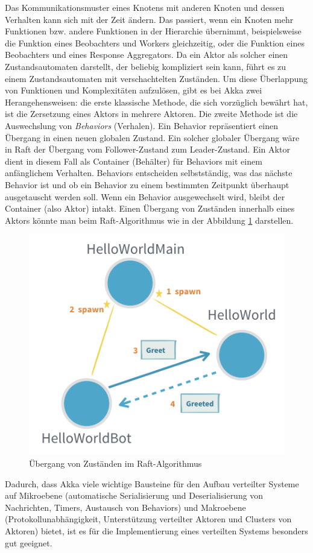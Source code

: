 Das Kommunikationsmuster eines Knotens mit anderen Knoten und dessen Verhalten kann sich mit der Zeit ändern. Das passiert, wenn ein Knoten mehr Funktionen bzw. andere Funktionen in der Hierarchie übernimmt, beispielsweise die Funktion eines Beobachters und Workers gleichzeitig, oder die Funktion eines Beobachters und eines Response Aggregators. Da ein Aktor als solcher einen Zustandsautomaten darstellt, der beliebig kompliziert sein kann, führt es zu einem Zustandsautomaten mit verschachtelten Zuständen. Um diese Überlappung von Funktionen und Komplexitäten aufzulösen, gibt es bei Akka zwei Herangehensweisen: die erste klassische Methode, die sich vorzüglich bewährt hat, ist die Zersetzung eines Aktors in mehrere Aktoren. Die zweite Methode ist die Auswechslung von \textit{Behaviors} (Verhalen). Ein Behavior repräsentiert einen Übergang in einen neuen globalen Zustand. Ein solcher globaler Übergang wäre in Raft der Übergang vom Follower-Zustand zum Leader-Zustand. Ein Aktor dient in diesem Fall als Container (Behälter) für Behaviors mit einem anfänglichem Verhalten. Behaviors entscheiden selbstständig, was das nächste Behavior ist und ob ein Behavior zu einem bestimmten Zeitpunkt überhaupt ausgetauscht werden soll. Wenn ein Behavior ausgewechselt wird, bleibt der Container (also Aktor) intakt. Einen Übergang von Zuständen innerhalb eines Aktors könnte man beim Raft-Algorithmus wie in der Abbildung \ref{fig:stateTransition} darstellen.

\begin{figure}
	\centering
	\includegraphics[width=0.7\linewidth]{images/4_state_transition}
	\caption{Übergang von Zuständen im Raft-Algorithmus}
	\label{fig:stateTransition}
\end{figure}

Dadurch, dass Akka viele wichtige Bausteine für den Aufbau verteilter Systeme auf Mikroebene (automatische Serialisierung und Deserialisierung von Nachrichten, Timers, Austausch von Behaviors) und Makroebene (Protokollunabhängigkeit, Unterstützung verteilter Aktoren und Clusters von Aktoren) bietet, ist es für die Implementierung eines verteilten Systems besonders gut geeignet.

